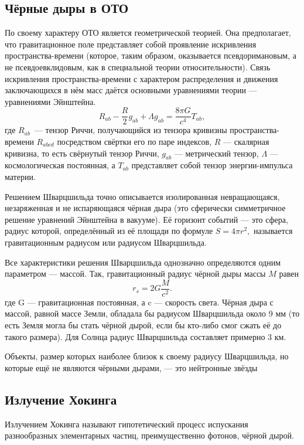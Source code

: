 \documentclass[a4paper, 12pt]{extarticle}
\begin{document}
  \subsection{Чёрные дыры в ОТО}

  По своему характеру ОТО является геометрической теорией. Она предполагает, что гравитационное поле
  представляет собой проявление искривления пространства-времени (которое, таким образом,
  оказывается псевдоримановым, а не псевдоевклидовым, как в специальной теории относительности).
  Связь искривления пространства-времени с характером распределения и движения заключающихся в нём
  масс даётся основными уравнениями теории — уравнениями Эйнштейна.
  \[
    R_{ab} - \frac{R}{2}  g_{ab} + \Lambda g_{ab} = \frac{8 \pi G}{c^4} T_{ab},
  \]
  где $R_{ab}$~--- тензор Риччи, получающийся из тензора кривизны пространства-времени $R_{abcd}$
  посредством свёртки его по паре индексов, $R$ — скалярная кривизна, то есть свёрнутый тензор
  Риччи, $g_{ab}$ — метрический тензор, $\Lambda$ — космологическая постоянная, а $T_{ab}$
  представляет собой тензор энергии-импульса материи.

  Решением Шварцшильда точно описывается изолированная невращающаяся, незаряженная и не испаряющаяся
  чёрная дыра (это сферически симметричное решение уравнений
  Эйнштейна в вакууме). Её горизонт событий — это сфера, радиус которой, определённый из её площади
  по формуле $S=4\pi r^2,$ называется гравитационным радиусом или радиусом Шварцшильда.

  Все характеристики решения Шварцшильда однозначно определяются одним параметром — массой. Так,
  гравитационный радиус чёрной дыры массы $M$ равен
  \[
      \boxed{
        r_s = 2G\frac{M}{c^2}.
      }
    \]
  где G — гравитационная постоянная, а c — скорость света. Чёрная дыра с массой, равной массе Земли,
  обладала бы радиусом Шварцшильда около 9 мм (то есть Земля могла бы стать чёрной дырой, если бы
  кто-либо смог сжать её до такого размера). Для Солнца радиус Шварцшильда составляет примерно 3 км.

  Объекты, размер которых наиболее близок к своему радиусу Шварцшильда, но которые ещё не являются
  чёрными дырами, — это нейтронные звёзды

  \subsection{Излучение Хокинга}

  Излучением Хокинга называют гипотетический процесс испускания разнообразных элементарных частиц,
  преимущественно фотонов, чёрной дырой.
\end{document}

